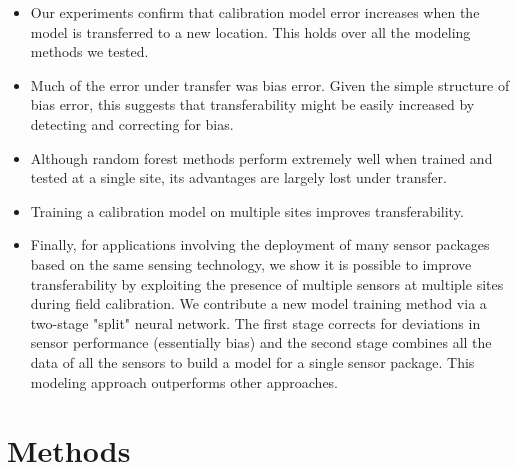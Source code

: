 \documentclass[journal abbreviation, manuscript]{copernicus}
\begin{document}
\begin{itemize}
\item Our experiments confirm that calibration model error increases when the model is transferred to a new location.  This holds over all the modeling methods we tested.
\item Much of the error under transfer was bias error.  Given the simple structure of bias error, this suggests that transferability might be easily increased by detecting and correcting for bias.
\item Although random forest methods perform extremely well when trained and tested at a single site, its advantages are largely lost under transfer.
\item Training a calibration model on multiple sites improves transferability.
\item Finally, for applications involving the deployment of many sensor packages based on the same sensing technology, we show it is possible to improve transferability by exploiting the presence of multiple sensors at multiple sites during field calibration.  We contribute a new model training method via a two-stage "split" neural network.  The first stage corrects for deviations in sensor performance (essentially bias) and the second stage combines all the data of all the sensors to build a model for a single sensor package.  This modeling approach outperforms other approaches.
\end{itemize}
 

\section{Methods}
\end{document}
